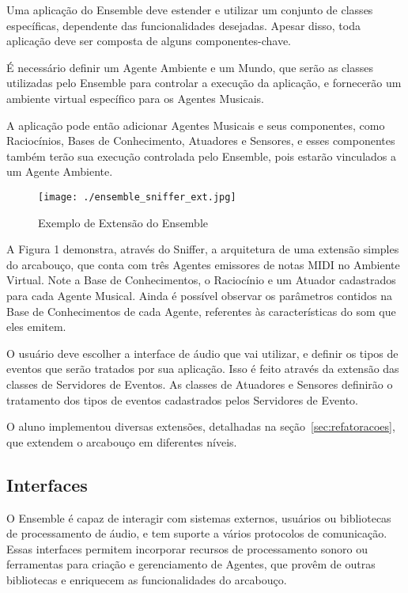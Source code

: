\documentclass[a4paper, 11pt, twoside]{article}
\begin{document}
\begin{multicols}{2}
Uma aplicação do Ensemble deve estender e utilizar um conjunto de classes
específicas, dependente das funcionalidades desejadas. Apesar disso,
toda aplicação deve ser composta de alguns componentes-chave. 

É necessário definir um Agente Ambiente e um Mundo, que serão as classes
utilizadas pelo Ensemble para controlar a execução da aplicação,
e fornecerão um ambiente virtual específico para os Agentes Musicais.

A aplicação pode então adicionar Agentes Musicais e seus componentes, 
como Raciocínios, Bases de Conhecimento, Atuadores e Sensores, e esses
componentes também terão sua execução controlada pelo Ensemble, pois
estarão vinculados a um Agente Ambiente.

\begin{figure}[H]
  \centering
  \texttt{[image: ./ensemble\_sniffer\_ext.jpg]}
  \caption{Exemplo de Extensão do Ensemble}
  \label{fig2}
\end{figure}

A Figura 1 demonstra, através do Sniffer, a arquitetura de uma extensão simples
do arcabouço, que conta com três Agentes emissores de notas
MIDI no Ambiente Virtual. Note a Base de Conhecimentos, 
o Raciocínio e um Atuador cadastrados
para cada Agente Musical. Ainda é possível observar os
parâmetros contidos na Base de Conhecimentos de cada
Agente, referentes às características do som que eles emitem.

O usuário deve escolher a interface de áudio que vai utilizar,
e definir os tipos de eventos que serão tratados por sua aplicação.
Isso é feito através da extensão das classes de Servidores de Eventos.
As classes de Atuadores e Sensores definirão o tratamento dos tipos
de eventos cadastrados pelos Servidores de Evento.

O aluno implementou diversas extensões, detalhadas na seção~\ref{sec:refatoracoes},  que extendem
o arcabouço em diferentes níveis. 

\subsection{Interfaces}

O Ensemble é capaz de interagir com sistemas externos, usuários ou 
bibliotecas de processamento de áudio, e tem suporte a vários protocolos de 
comunicação. Essas interfaces permitem incorporar recursos de processamento sonoro 
ou ferramentas para criação e gerenciamento de Agentes, que provêm de outras 
bibliotecas e enriquecem as funcionalidades do arcabouço.


\end{multicols}
\end{document}
